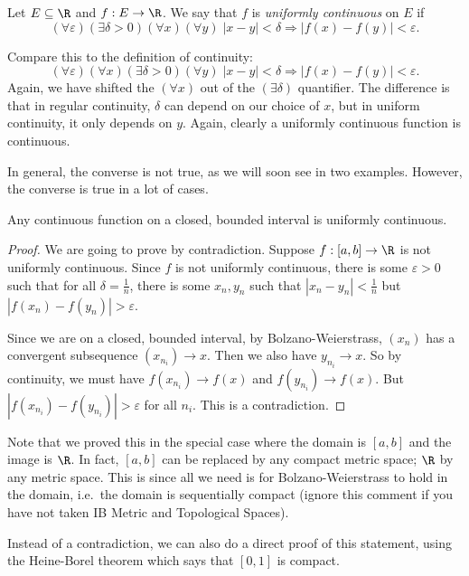 \documentclass[a4paper]{article}
\begin{document}
\begin{defi}
  Let $E \subseteq \R$ and $f: E\to \R$. We say that $f$ is \emph{uniformly continuous} on $E$ if
  \[
    (\forall \varepsilon)(\exists \delta > 0)(\forall x)(\forall y)\; |x - y| < \delta \Rightarrow |f(x) - f(y)| < \varepsilon.
  \]
\end{defi}
Compare this to the definition of continuity:
\[
  (\forall \varepsilon)(\forall x)(\exists \delta > 0)(\forall y)\; |x - y| < \delta \Rightarrow |f(x) - f(y)| < \varepsilon.
\]
Again, we have shifted the $(\forall x)$ out of the $(\exists \delta)$ quantifier. The difference is that in regular continuity, $\delta$ can depend on our choice of $x$, but in uniform continuity, it only depends on $y$. Again, clearly a uniformly continuous function is continuous.

In general, the converse is not true, as we will soon see in two examples. However, the converse is true in a lot of cases.
\begin{thm}
  Any continuous function on a closed, bounded interval is uniformly continuous.
\end{thm}

\begin{proof}
  We are going to prove by contradiction. Suppose $f: [a, b] \to \R$ is not uniformly continuous. Since $f$ is not uniformly continuous, there is some $\varepsilon > 0$ such that for all $\delta = \frac{1}{n}$, there is some $x_n, y_n$ such that $|x_n - y_n| < \frac{1}{n}$ but $|f(x_n) - f(y_n)| > \varepsilon$.

  Since we are on a closed, bounded interval, by Bolzano-Weierstrass, $(x_n)$ has a convergent subsequence $(x_{n_i}) \to x$. Then we also have $y_{n_i}\to x$. So by continuity, we must have $f(x_{n_i}) \to f(x)$ and $f(y_{n_i}) \to f(x)$. But $|f(x_{n_i}) - f(y_{n_i})| > \varepsilon$ for all $n_i$. This is a contradiction.
\end{proof}
Note that we proved this in the special case where the domain is $[a, b]$ and the image is $\R$. In fact, $[a, b]$ can be replaced by any compact metric space; $\R$ by any metric space. This is since all we need is for Bolzano-Weierstrass to hold in the domain, i.e.\ the domain is sequentially compact (ignore this comment if you have not taken IB Metric and Topological Spaces).

Instead of a contradiction, we can also do a direct proof of this statement, using the Heine-Borel theorem which says that $[0, 1]$ is compact.
\end{document}
